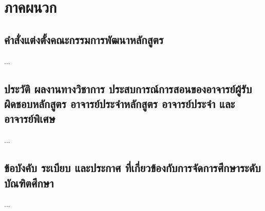 \chapter*{ภาคผนวก}

\setcounter{section}{0}

\section{คำสั่งแต่งตั้งคณะกรรมการพัฒนาหลักสูตร}

...

\section{ประวัติ ผลงานทางวิชาการ ประสบการณ์การสอนของอาจารย์ผู้รับผิดชอบหลักสูตร อาจารย์ประจำหลักสูตร อาจารย์ประจำ และอาจารย์พิเศษ}

...

\section{ข้อบังคับ ระเบียบ และประกาศ ที่เกี่ยวข้องกับการจัดการศึกษาระดับบัณฑิตศึกษา}

...

